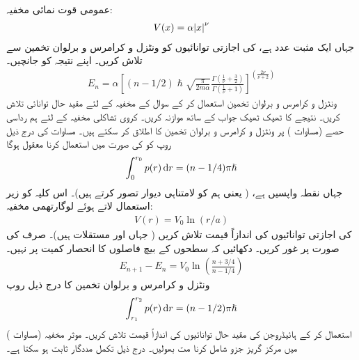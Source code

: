 عمومی قوت نمائی مخفیہ:
\begin{align*}
	V(x)=\alpha\abs{x}^{\nu}
\end{align*}
جہاں  ایک مثبت عدد ہے، کی اجازتی توانائیوں کو ونٹزل و کرامرس و برلوان تخمین سے تلاش کریں۔ اپنے نتیجہ کو  جانچیں۔ 
\begin{align}\label{مساوات_وقب_قوت_نمائی_نتیجہ}
	E_{n}=\alpha\left[(n-1/2)\hslash\sqrt{\frac{\pi}{2m\alpha}}\frac{\Gamma\left(\frac{1}{\nu}+\frac{3}{2}\right)}{\Gamma\left(\frac{1}{\nu}+1\right)}\right]^{\left(\frac{2\nu}{\nu+2}\right)}
\end{align}
 ونٹزل و کرامرس و برلوان تخمین استعمال کر کے سوال  کے مخفیہ کے لئے مقید حال توانائی تلاش کریں۔ نتیجے کا ٹھیک ٹھیک جواب کے ساتھ موازنہ کریں۔ 
کروی تشاکلی مخفیہ کے لئے ہم رداسی حصے (مساوات ) پر ونٹزل و کرامرس و برلوان تخمین کا اطلاق کر سکتے ہیں۔ مساوات  کی درج ذیل روپ کو  کی صورت میں استعمال کرنا معقول ہوگا 
\begin{align}
	\int^{r_{0}}_{0}p(r)\dif r=(n-1/4)\pi\hslash
\end{align}
جہاں  نقطہ واپسیں ہے، ( یعنی ہم  کو لامتناہی دیوار تصور کرتے ہیں)۔ اس کلیہ کو زیر استعمال لاتے ہوئے لوگارتھمی مخفیہ:
\begin{align*}
	V(r)=V_{0}\ln(r/a)
\end{align*}
کی اجازتی توانائیوں کی اندازاً قیمت تلاش کریں ( جہاں  اور  مستقلات ہیں)۔ صرف  کی صورت پر غور کریں۔ دکھائیں کہ سطحوں کے بیچ فاصلوں کا انحصار کمیت پر نہیں۔
\begin{align*}
	E_{n+1}-E_{n}=V_{0}\ln\left(\frac{n+3/4}{n-1/4}\right)
\end{align*}
 ونٹزل و کرامرس و برلوان تخمین کا درج ذیل روپ
\begin{align}
	\int^{r_{2}}_{r_{1}}p(r)\dif r=(n-1/2)\pi\hslash
\end{align}
استعمال کر کے ہائیڈروجن کی مقید حال توانائیوں کی اندازاً قیمت تلاش کریں۔ موثر مخفیہ (مساوات ) میں مرکز گریز جزو شامل کرنا مت بھولیں۔ درج ذیل تکمل مددگار ثابت ہو سکتا ہے۔
